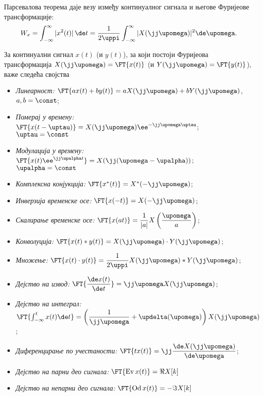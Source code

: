 \noindent 
Парсевалова теорема даје везу између  континуалног сигнала и његове
Фуријеове трансформације:
\begin{equation}
W_x = \int_{-\infty}^{\infty} |x^2(t)|\,\de t = \dfrac{1}{2\uppi}\int_{-\infty}^{\infty} |X(\jj\upomega)|^2 \de \upomega. \label{s:ctft:parseval}
\end{equation}


За континуални сигнал $x(t)$ (и $y(t)$), за који постоји Фуријеова трансформација
$X(\jj\upomega) = \FT{x(t)}$ (и $Y(\jj\upomega) = \FT{y(t)}$), важе следећа својства
\begin{itemize}
    \item \emph{Линеарност:} $\FT{ax(t) + by(t)} = a X(\jj\upomega) + b Y(\jj\upomega)$, \qquad $a,b = \const$; \hfill \Svojstvo
    \item \emph{Померај у времену:} $\FT{x(t-\uptau)} = X(\jj\upomega) \ee^{-\jj\upomega \uptau}$; \qquad $\uptau = \const$ \hfill \Svojstvo
    \item \emph{Модулација у времену:} $\FT{x(t) \ee^{\jj\upalpha t}} = X(\jj(\upomega - \upalpha))$; \qquad $\upalpha = \const$ \hfill \Svojstvo
    \item \emph{Комплексна конјукција:} $\FT{x^{\ast}(t) } = X^{\ast}(-\jj\upomega)$;  \hfill \Svojstvo
    \item \emph{Инверзија временске осе:} $\FT{x(-t) } = X(-\jj\upomega)$;  \hfill \Svojstvo
    \item \emph{Скалирање временске осе:} $\FT{x(at)} = \dfrac{1}{|a|} X\left( \dfrac{\upomega}{a} \right)$; \hfill \Svojstvo
    \item \emph{Конволуција:} $\FT{x(t) \ast y(t)} = X(\jj\upomega) \cdot Y(\jj\upomega)$;  \hfill \Svojstvo
    \item \emph{Множење:} $\FT{x(t) \cdot y(t)} = \dfrac{1}{2\uppi} X(\jj\upomega) \ast Y(\jj\upomega)$; \hfill \Svojstvo
    \item \emph{Дејство на извод:} $ \FT{ \dfrac{ \de x(t)}{\de t}} = \jj\upomega X(\jj\upomega)$; \hfill \Svojstvo
    \item \emph{Дејство на интеграл:} $ \FT{ \int_{-\infty}^{t} x(t) \de t} =  
    \left( 
        \dfrac{1}{\jj\upomega} + \updelta(\upomega)
    \right) X(\jj\upomega)$; \hfill \Svojstvo
    \item \emph{Диференцирање по учестаности:} 
    $
    \FT{ t x(t) } = \jj \dfrac{\de X(\jj\upomega)}{\de \upomega}
    $; \hfill \Svojstvo
    \item \emph{Дејство на парни део сигнала:}
    $ 
    \FT{ \operatorname{Ev}x(t)} = \Re{X[k]}
    $ \hfill \Svojstvo
    \item \emph{Дејство на непарни део сигнала:}
    $
    \FT{ \operatorname{Od}x(t)} = -\Im{X[k]}
    $\hfill \Svojstvo
    
\end{itemize} 


